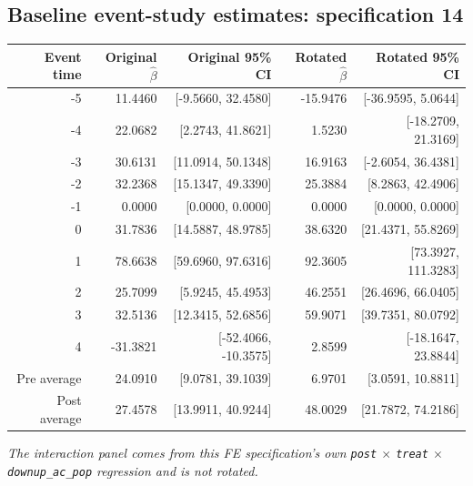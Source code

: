 \documentclass[10pt]{article}
\begin{document}
\subsection*{Baseline event-study estimates: specification 14}
\begin{center}
\scriptsize
\begin{tabular}{r rr rr}
\toprule
Event time & Original $\hat\beta$ & Original 95\% CI & Rotated $\hat\beta$ & Rotated 95\% CI \\
\midrule
-5 & 11.4460 & [-9.5660, 32.4580] & -15.9476 & [-36.9595, 5.0644] \\
-4 & 22.0682 & [2.2743, 41.8621] & 1.5230 & [-18.2709, 21.3169] \\
-3 & 30.6131 & [11.0914, 50.1348] & 16.9163 & [-2.6054, 36.4381] \\
-2 & 32.2368 & [15.1347, 49.3390] & 25.3884 & [8.2863, 42.4906] \\
-1 & 0.0000 & [0.0000, 0.0000] & 0.0000 & [0.0000, 0.0000] \\
0 & 31.7836 & [14.5887, 48.9785] & 38.6320 & [21.4371, 55.8269] \\
1 & 78.6638 & [59.6960, 97.6316] & 92.3605 & [73.3927, 111.3283] \\
2 & 25.7099 & [5.9245, 45.4953] & 46.2551 & [26.4696, 66.0405] \\
3 & 32.5136 & [12.3415, 52.6856] & 59.9071 & [39.7351, 80.0792] \\
4 & -31.3821 & [-52.4066, -10.3575] & 2.8599 & [-18.1647, 23.8844] \\
\midrule
Pre average & 24.0910 & [9.0781, 39.1039] & 6.9701 & [3.0591, 10.8811] \\
Post average & 27.4578 & [13.9911, 40.9244] & 48.0029 & [21.7872, 74.2186] \\
\bottomrule
\end{tabular}
\end{center}
\medskip
\textit{The interaction panel comes from this FE specification's own \texttt{post} $\times$ \texttt{treat} $\times$ \texttt{downup\_ac\_pop} regression and is not rotated.}
\clearpage
\end{document}
